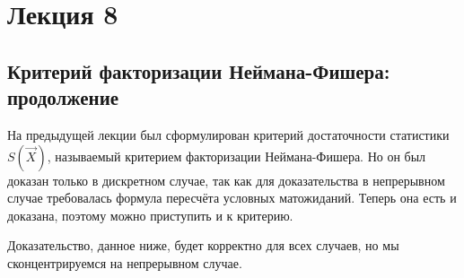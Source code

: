
\section{Лекция 8}
\subsection{Критерий факторизации Неймана-Фишера: продолжение}
На предыдущей лекции был сформулирован критерий достаточности статистики $S(\vec{X})$, называемый критерием факторизации Неймана-Фишера. Но он был доказан только в дискретном случае, так как для доказательства в непрерывном случае требовалась формула пересчёта условных матожиданий. Теперь она есть и доказана, поэтому можно приступить и к критерию.

Доказательство, данное ниже, будет корректно для всех случаев, но мы сконцентрируемся на непрерывном случае.
